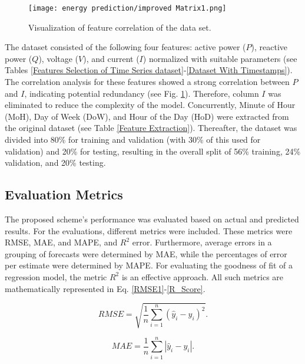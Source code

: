 \documentclass[journal]{IEEEtran}
\begin{document}
 
\begin{figure}[!h]
    \centering
    \texttt{[image: energy prediction/improved Matrix1.png]}
        \caption{Visualization of feature correlation of the data set.}
    \label{Features correlation }
\end{figure}
The dataset consisted of the following four features: active power ($P$), reactive power ($Q$), voltage ($V$), and current ($I$) normalized with suitable parameters (see Tables \ref{Features Selection of Time Series dataset}-\ref{Dataset With Timestamps}). The correlation analysis for these features showed a strong correlation between $P$ and $I$, indicating potential redundancy (see Fig. \ref{Features correlation }). Therefore, column $I$ was eliminated to reduce the complexity of the model. Concurrently, Minute of Hour (MoH), Day of Week (DoW), and Hour of the Day (HoD) were extracted from the original dataset (see Table \ref{Feature Extraction}). Thereafter, the dataset was divided into 80\% for training and validation (with 30\% of this used for validation) and  20\% for testing, resulting in the overall split of 56\% training, 24\% validation, and 20\% testing. 








\subsection{Evaluation Metrics}
The proposed scheme's performance was evaluated based on actual and predicted results. For the evaluations, different metrics were included. These metrics were RMSE, MAE, and MAPE, and $R^2$ error. Furthermore, average errors in a grouping of forecasts were determined by MAE, while the percentages of error per estimate were determined by MAPE. For evaluating the goodness of fit of a regression model, the metric $R^2$ is an effective approach. All such metrics are mathematically represented in Eq. \eqref{RMSE1}-\eqref{R_Score}.






 



\begin{equation}
RMSE = \sqrt{\frac{1}{n} \sum_{i=1}^{n} (\hat{y}_i - y_i)^2}.
\label{RMSE1}
\end{equation}


\begin{equation}
    MAE = \frac{1}{n} \sum_{i=1}^{n} \left| \hat{y}_i - y_i \right|.
    \label{MAE1}
\end{equation}
\end{document}
